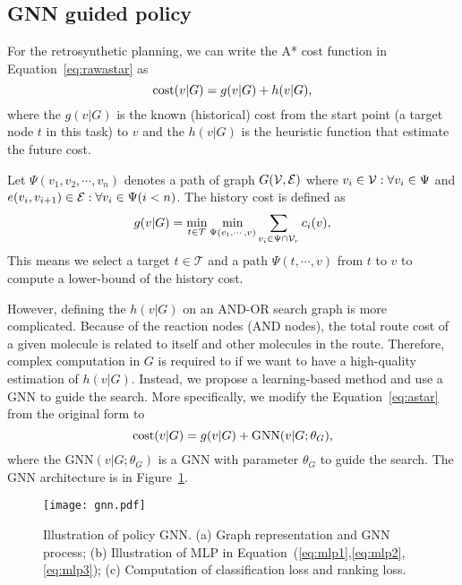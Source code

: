 \documentclass[sigconf]{acmart}
\begin{document}
\subsection{GNN guided policy}\label{sec:gnn}
For the retrosynthetic planning, we can write the A* cost function in Equation~\eqref{eq:rawastar} as
\begin{equation}\label{eq:astar}
    \text{cost}(v|G) = g(v|G) + h(v|G),
\end{equation}
where the $g(v|G)$ is the known (historical) cost from the start point (a target node $t$ in this task) to $v$ and the $h(v|G)$ is the heuristic function that estimate the future cost.

Let $\Psi(v_1, v_2, \cdots, v_n)$ denotes a path of graph $G(\mathcal{V}, \mathcal{E})$ where $v_i \in \mathcal{V}: \forall v_i \in \Psi$ and $e(v_i, v_{i+1}) \in \mathcal{E}: \forall  v_i \in \Psi (i<n)$.
The history cost is defined as 
\begin{equation}\label{eq:costh}
    g(v|G) = \min_{t\in\mathcal{T}} \min_{\Psi(v_t,\cdots,v)} \sum_{v_i\in \Psi \cap \mathcal{V}_r} c_i(v),
\end{equation}
This means we select a target $t\in\mathcal{T}$ and a path $\Psi(t,\cdots,v)$ from $t$ to $v$ to compute a lower-bound of the history cost.

However, defining the $h(v|G)$ on an AND-OR search graph is more complicated.
Because of the reaction nodes (AND nodes), the total route cost of a given molecule is related to itself and other molecules in the route.
Therefore, complex computation in $G$ is required to if we want to have a high-quality estimation of $h(v|G)$.
Instead, we propose a learning-based method and use a GNN to guide the search.
More specifically, we modify the Equation~\eqref{eq:astar} from the original form to 
\begin{equation}\label{eq:gnn_plan}
    \text{cost}(v|G) = g(v|G) + \text{GNN}(v|G; \theta_{G}),
\end{equation}
where the $\text{GNN}(v|G; \theta_{G})$ is a GNN with parameter $\theta_{G}$ to guide the search.
The GNN architecture is in Figure~\ref{fig:gnn}.

\begin{figure}[!htbp]
    \centering
    \texttt{[image: gnn.pdf]}
\caption{Illustration of policy GNN. (a) Graph representation and GNN process; (b) Illustration of MLP in Equation~(\ref{eq:mlp1},\ref{eq:mlp2},\ref{eq:mlp3}); (c) Computation of classification loss and ranking loss.}
    \label{fig:gnn}
\end{figure}
\end{document}
